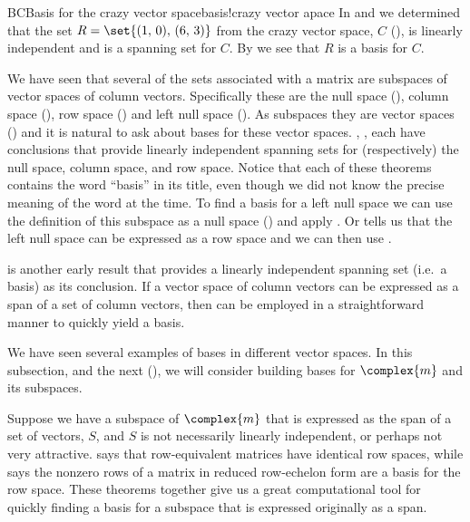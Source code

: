 %
\begin{example}{BC}{Basis for the crazy vector space}{basis!crazy vector apace}
In  and  we determined that the set $R=\set{(1,\,0),\,(6,\,3)}$ from the crazy vector space, $C$ (), is linearly independent and is a spanning set for $C$.  By  we see that $R$ is a basis for $C$.
\end{example}
%
We have seen that several of the sets associated with a matrix are subspaces of vector spaces of column vectors.  Specifically these are the null space (), column space (), row space  () and left null space ().  As subspaces they are vector spaces () and it is natural to ask about bases for these vector spaces.  , ,  each have conclusions that provide linearly independent spanning sets for (respectively) the null space, column space, and row space.  Notice that each of these theorems contains the word ``basis'' in its title, even though we did not know the precise meaning of the word at the time.  To find a basis for a left null space we can use the definition of this subspace as a null space () and  apply .  Or  tells us that the left null space can be expressed as a row space and we can then use .\par
%
 is another early result that provides a linearly independent spanning set (i.e.\ a basis) as its conclusion.  If a vector space of column vectors can be expressed as a span of a set of column vectors, then  can be employed in a straightforward manner to quickly yield a basis.\par
%
%
We have seen several examples of bases in different vector spaces.  In this subsection, and the next (), we will consider building bases for $\complex{m}$ and its subspaces.\par
%
Suppose we have a subspace of $\complex{m}$ that is expressed as the span of a set of vectors, $S$, and $S$ is not necessarily linearly independent, or perhaps not very attractive.   says that row-equivalent matrices have identical row spaces, while  says the nonzero rows of a matrix in reduced row-echelon form are a basis for the row space.  These theorems together give us a great computational tool for quickly finding a basis for a subspace that is expressed originally as a span.\par

